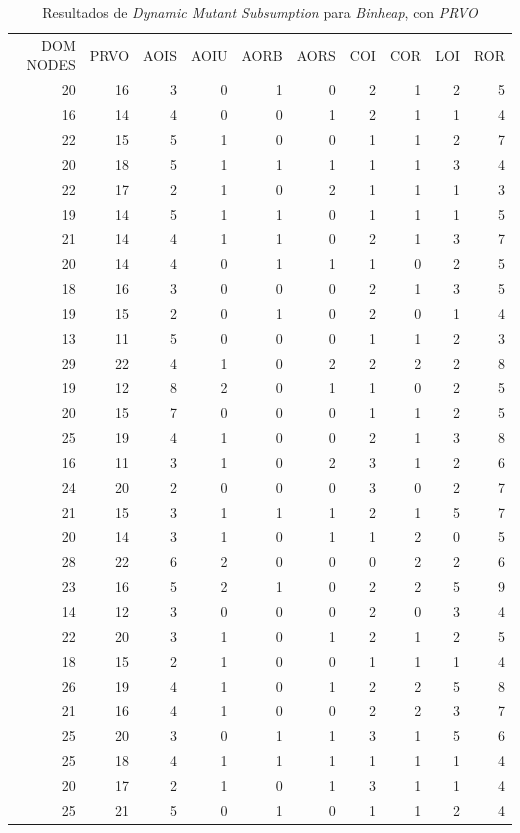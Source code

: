 \begin{table}[]
	\caption[\emph{Dynamic Mutant Subsumption} \emph{Binheap}, con \emph{PRVO}]{Resultados de \emph{Dynamic Mutant Subsumption} para \emph{Binheap}, con \emph{PRVO}}
	\label{tables.results.subsumption.binheap.prvo}
	\centering
	\scriptsize
	\def\arraystretch{0.95}
	\setlength\tabcolsep{0.5mm}
	\begin{tabular}{rrrrrrrrrr}
		DOM NODES & PRVO & AOIS & AOIU & AORB & AORS & COI & COR & LOI & ROR \\
		20 & 16 & 3 & 0 & 1 & 0 & 2 & 1 & 2 & 5 \\
		16 & 14 & 4 & 0 & 0 & 1 & 2 & 1 & 1 & 4 \\
		22 & 15 & 5 & 1 & 0 & 0 & 1 & 1 & 2 & 7 \\
		20 & 18 & 5 & 1 & 1 & 1 & 1 & 1 & 3 & 4 \\
		22 & 17 & 2 & 1 & 0 & 2 & 1 & 1 & 1 & 3 \\
		19 & 14 & 5 & 1 & 1 & 0 & 1 & 1 & 1 & 5 \\
		21 & 14 & 4 & 1 & 1 & 0 & 2 & 1 & 3 & 7 \\
		20 & 14 & 4 & 0 & 1 & 1 & 1 & 0 & 2 & 5 \\
		18 & 16 & 3 & 0 & 0 & 0 & 2 & 1 & 3 & 5 \\
		19 & 15 & 2 & 0 & 1 & 0 & 2 & 0 & 1 & 4 \\
		13 & 11 & 5 & 0 & 0 & 0 & 1 & 1 & 2 & 3 \\
		29 & 22 & 4 & 1 & 0 & 2 & 2 & 2 & 2 & 8 \\
		19 & 12 & 8 & 2 & 0 & 1 & 1 & 0 & 2 & 5 \\
		20 & 15 & 7 & 0 & 0 & 0 & 1 & 1 & 2 & 5 \\
		25 & 19 & 4 & 1 & 0 & 0 & 2 & 1 & 3 & 8 \\
		16 & 11 & 3 & 1 & 0 & 2 & 3 & 1 & 2 & 6 \\
		24 & 20 & 2 & 0 & 0 & 0 & 3 & 0 & 2 & 7 \\
		21 & 15 & 3 & 1 & 1 & 1 & 2 & 1 & 5 & 7 \\
		20 & 14 & 3 & 1 & 0 & 1 & 1 & 2 & 0 & 5 \\
		28 & 22 & 6 & 2 & 0 & 0 & 0 & 2 & 2 & 6 \\
		23 & 16 & 5 & 2 & 1 & 0 & 2 & 2 & 5 & 9 \\
		14 & 12 & 3 & 0 & 0 & 0 & 2 & 0 & 3 & 4 \\
		22 & 20 & 3 & 1 & 0 & 1 & 2 & 1 & 2 & 5 \\
		18 & 15 & 2 & 1 & 0 & 0 & 1 & 1 & 1 & 4 \\
		26 & 19 & 4 & 1 & 0 & 1 & 2 & 2 & 5 & 8 \\
		21 & 16 & 4 & 1 & 0 & 0 & 2 & 2 & 3 & 7 \\
		25 & 20 & 3 & 0 & 1 & 1 & 3 & 1 & 5 & 6 \\
		25 & 18 & 4 & 1 & 1 & 1 & 1 & 1 & 1 & 4 \\
		20 & 17 & 2 & 1 & 0 & 1 & 3 & 1 & 1 & 4 \\
		25 & 21 & 5 & 0 & 1 & 0 & 1 & 1 & 2 & 4
	\end{tabular}
\end{table}

